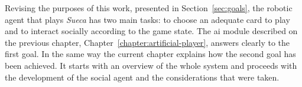 \label{chapter:sueca-player}

Revising the purposes of this work, presented in Section~\ref{sec:goals}, the robotic agent that plays \emph{Sueca} has two main tasks: to choose an adequate card to play and to interact socially according to the game state.
The \ac{ai} module described on the previous chapter, Chapter~\ref{chapter:artificial-player}, answers clearly to the first goal.
In the same way the current chapter explains how the second goal has been achieved.
It starts with an overview of the whole system and proceeds
with the development of the social agent and the considerations that were taken.




\clearpage

